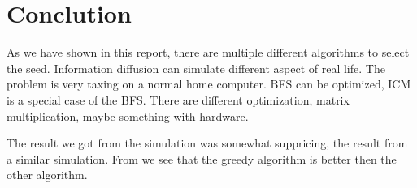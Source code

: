 \chapter{Conclution}
As we have shown in this report, there are multiple different algorithms to select the seed. Information diffusion can simulate different aspect of real life. The problem is very taxing on a normal home computer. BFS can be optimized, ICM is a special case of the BFS. There are different optimization, matrix multiplication, maybe something with hardware. 

The result we got from the simulation was somewhat suppricing, the result from a similar simulation\cite{MaximizedSpread2003}. From \cite{MaximizedSpread2003} we see that the greedy algorithm is better then the other algorithm. 